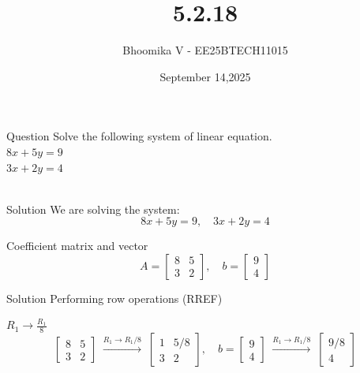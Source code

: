 \documentclass{beamer}
\begin{document}
\title 
{5.2.18}
\date{September 14,2025}


\author 
{Bhoomika V - EE25BTECH11015}




\frame{\titlepage}
\begin{frame}{Question}
Solve the following system of linear equation.\\ 
$8x + 5y = 9$\\ 
$3x + 2y = 4$\\ \\ 
\end{frame}

\begin{frame}{Solution}
We are solving the system:
\[
8x + 5y = 9, \quad 3x + 2y = 4
\]

Coefficient matrix and vector
\[
A = \begin{bmatrix} 8 & 5 \\ 3 & 2 \end{bmatrix}, \quad 
b = \begin{bmatrix} 9 \\ 4 \end{bmatrix}
\]
\end{frame}

\begin{frame}{Solution}
Performing row operations (RREF)

\(R_1 \to \frac{R_1}{8}\)
\[
\begin{bmatrix} 8 & 5 \\ 3 & 2 \end{bmatrix} 
\;\overset{R_1 \to R_1/8}{\longrightarrow}\;
\begin{bmatrix} 1 & 5/8 \\ 3 & 2 \end{bmatrix}, \quad
b = \begin{bmatrix} 9 \\ 4 \end{bmatrix} 
\;\overset{R_1 \to R_1/8}{\longrightarrow}\;
\begin{bmatrix} 9/8 \\ 4 \end{bmatrix}
\]
\end{frame}
\end{document}
